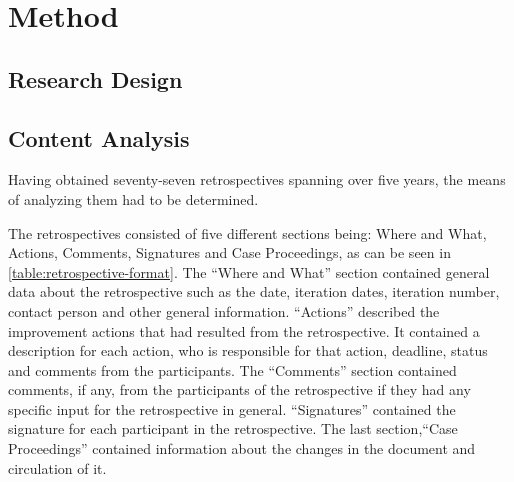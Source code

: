 \chapter{Method}
\section{Research Design}

\section{Content Analysis}
Having obtained seventy-seven retrospectives spanning over five years, the means of analyzing them had to be determined. 

The retrospectives consisted of five different sections being: Where and What, Actions, Comments, Signatures and Case Proceedings, as can be seen in \autoref{table:retrospective-format}. 
The ``Where and What'' section contained general data about the retrospective such as the date, iteration dates, iteration number, contact person and other general information. ``Actions'' described the improvement actions that had resulted from the retrospective. It contained a description for each action, who is responsible for that action, deadline, status and comments from the participants. The ``Comments'' section contained comments, if any, from the participants of the retrospective if they had any specific input for the retrospective in general. ``Signatures'' contained the signature for each participant in the retrospective. The last section,``Case Proceedings'' contained information about the changes in the document and circulation of it.

\begin{table}[!h]
	\begin{center}
	\caption{The section of the retrospectives}
	\label{table:retrospective-format}
\end{center}
\end{table}

